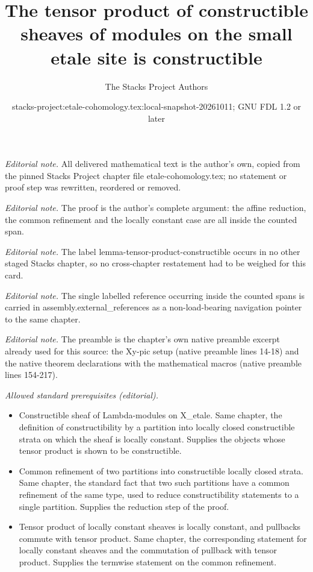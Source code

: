 \documentclass[10pt,a4paper]{amsart}
\title{The tensor product of constructible sheaves of modules on the small etale site is constructible}
\author{The Stacks Project Authors}
\date{stacks-project:etale-cohomology.tex:local-snapshot-20261011; GNU FDL 1.2 or later}
\theoremstyle{plain}
\theoremstyle{definition}
\theoremstyle{remark}
\numberwithin{equation}{subsection}
\begin{document}
\maketitle
\noindent\textit{Editorial note.} All delivered mathematical text is the author's own, copied from the pinned Stacks Project chapter file etale-cohomology.tex; no statement or proof step was rewritten, reordered or removed.\par\medskip
\noindent\textit{Editorial note.} The proof is the author's complete argument: the affine reduction, the common refinement and the locally constant case are all inside the counted span.\par\medskip
\noindent\textit{Editorial note.} The label lemma-tensor-product-constructible occurs in no other staged Stacks chapter, so no cross-chapter restatement had to be weighed for this card.\par\medskip
\noindent\textit{Editorial note.} The single labelled reference occurring inside the counted spans is carried in assembly.external\_references as a non-load-bearing navigation pointer to the same chapter.\par\medskip
\noindent\textit{Editorial note.} The preamble is the chapter's own native preamble excerpt already used for this source: the Xy-pic setup (native preamble lines 14-18) and the native theorem declarations with the mathematical macros (native preamble lines 154-217).\par\medskip
\noindent\textit{Allowed standard prerequisites (editorial).}\begin{itemize}
\item Constructible sheaf of Lambda-modules on X\_etale. Same chapter, the definition of constructibility by a partition into locally closed constructible strata on which the sheaf is locally constant. Supplies the objects whose tensor product is shown to be constructible.
\item Common refinement of two partitions into constructible locally closed strata. Same chapter, the standard fact that two such partitions have a common refinement of the same type, used to reduce constructibility statements to a single partition. Supplies the reduction step of the proof.
\item Tensor product of locally constant sheaves is locally constant, and pullbacks commute with tensor product. Same chapter, the corresponding statement for locally constant sheaves and the commutation of pullback with tensor product. Supplies the termwise statement on the common refinement.
\end{itemize}\medskip
\end{document}
